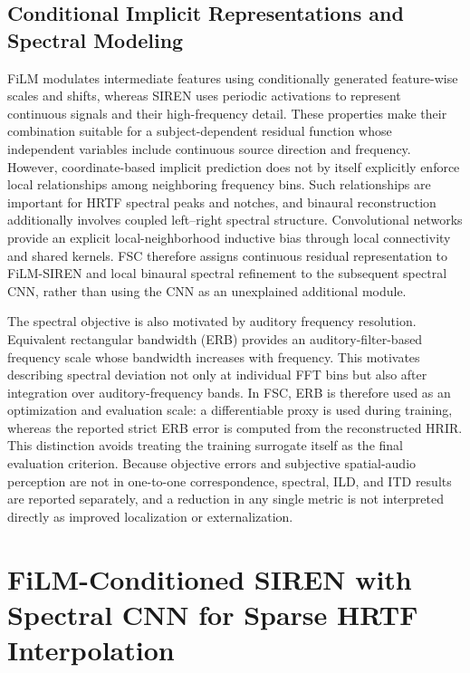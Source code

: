 \documentclass[UTF8,a4paper]{article}
\begin{document}
\subsection{Conditional Implicit Representations and Spectral Modeling}

FiLM modulates intermediate features using conditionally generated feature-wise scales and shifts\cite{R7}, whereas SIREN uses periodic activations to represent continuous signals and their high-frequency detail\cite{R11}. These properties make their combination suitable for a subject-dependent residual function whose independent variables include continuous source direction and frequency. However, coordinate-based implicit prediction does not by itself explicitly enforce local relationships among neighboring frequency bins. Such relationships are important for HRTF spectral peaks and notches, and binaural reconstruction additionally involves coupled left--right spectral structure. Convolutional networks provide an explicit local-neighborhood inductive bias through local connectivity and shared kernels\cite{R21}. FSC therefore assigns continuous residual representation to FiLM-SIREN and local binaural spectral refinement to the subsequent spectral CNN, rather than using the CNN as an unexplained additional module.

The spectral objective is also motivated by auditory frequency resolution. Equivalent rectangular bandwidth (ERB) provides an auditory-filter-based frequency scale whose bandwidth increases with frequency\cite{R23}. This motivates describing spectral deviation not only at individual FFT bins but also after integration over auditory-frequency bands. In FSC, ERB is therefore used as an optimization and evaluation scale: a differentiable proxy is used during training, whereas the reported strict ERB error is computed from the reconstructed HRIR. This distinction avoids treating the training surrogate itself as the final evaluation criterion. Because objective errors and subjective spatial-audio perception are not in one-to-one correspondence\cite{R18}, spectral, ILD, and ITD results are reported separately, and a reduction in any single metric is not interpreted directly as improved localization or externalization.

\section{FiLM-Conditioned SIREN with Spectral CNN for Sparse HRTF Interpolation}
\label{sec:method}
\end{document}
